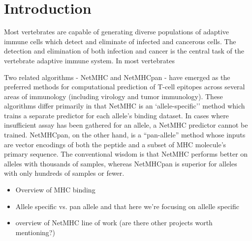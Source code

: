\section{Introduction}
  
Most vertebrates are capable of generating diverse populations of adaptive immune cells which detect and eliminate of infected and cancerous cells.
The detection and elimination of both infection and cancer is the central task of the vertebrate adaptive immune system. 
In most vertebrates \cite{Anderson_2004}



Two related algorithms - NetMHC and NetMHCpan - have emerged as the preferred methods for computational prediction of T-cell epitopes across several areas of immunology (including virology\cite{Lund_2011} and tumor immunology\cite{Gubin_2015}). These algorithms differ primarily in that NetMHC is an `allele-specific'' method which trains a separate predictor for each allele's binding dataset. In cases where insufficient assay has been gathered for an allele, a NetMHC predictor cannot be trained. NetMHCpan, on the other hand, is a ``pan-allele'' method whose inputs are vector encodings of both the peptide and a subset of MHC molecule's primary sequence. The conventional wisdom is that NetMHC performs better on alleles with thousands of samples, whereas NetMHCpan is superior for alleles with only hundreds of samples or fewer. 


\begin{itemize}
\item Overview of MHC binding
\item Allele specific vs. pan allele and that here we're focusing on allelle specific
\item overview of NetMHC line of work (are there other projects worth mentioning?)
\end{itemize}

